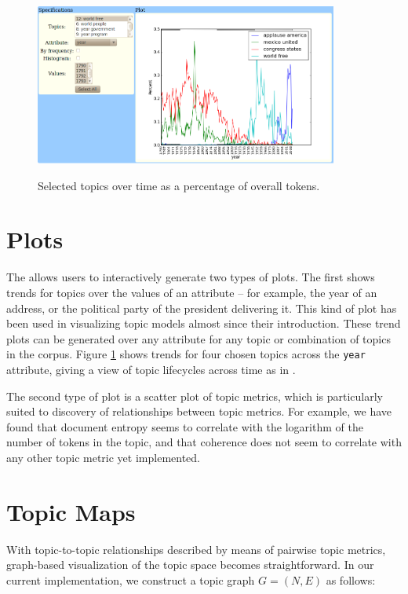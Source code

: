 \documentclass[11pt]{article}
\begin{document}
\begin{figure}[t]
 \centering
 \includegraphics[height=200px,keepaspectratio=true]{./topics_vs_years.png}
 \label{fig:chart}
 \caption{Selected topics over time as a percentage of overall tokens.}
\end{figure}

\section{Plots}
The \tool{} allows users to interactively generate two types of plots. The ﬁrst
shows trends for topics over the values of an attribute -- for example, the year
of an address, or the political party of the president delivering it. This kind
of plot has been used in visualizing topic models almost since their
introduction. These trend plots can be generated over any attribute for any
topic or combination of topics in the corpus. Figure \ref{fig:chart} shows
trends for four chosen topics across the \texttt{year} attribute, giving a view
of topic lifecycles across time as in \cite{Griffiths2004,Wang2006}.

The second type of plot is a scatter plot of topic metrics, which is
particularly suited to discovery of relationships between topic metrics. For
example, we have found that document entropy seems to correlate with the
logarithm of the number of tokens in the topic, and that coherence does not seem
to correlate with any other topic metric yet implemented.



\section{Topic Maps}\label{sec:maps}
With topic-to-topic relationships described by means of pairwise topic metrics,
graph-based visualization of the topic space becomes straightforward. In our
current implementation, we construct a topic graph $G = (N, E)$ as follows:
\end{document}
